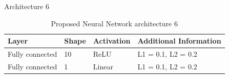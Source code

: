 \documentclass{article}
\begin{document}
\pagebreak

Architecture 6

\begin{table}[!htb]
\centering
\begin{tabular}{l l l l}
	\hline
	Layer & Shape & Activation & Additional Information\\
  	\hline
  	Fully connected & 10 & ReLU & L1 = 0.1, L2 = 0.2\\
  	Fully connected & 1 & Linear & L1 = 0.1, L2 = 0.2\\
  	\hline
\end{tabular}
\caption{Proposed Neural Network architecture 6}
\label{table:proposed_nn_6}
\end{table}







\end{document}
